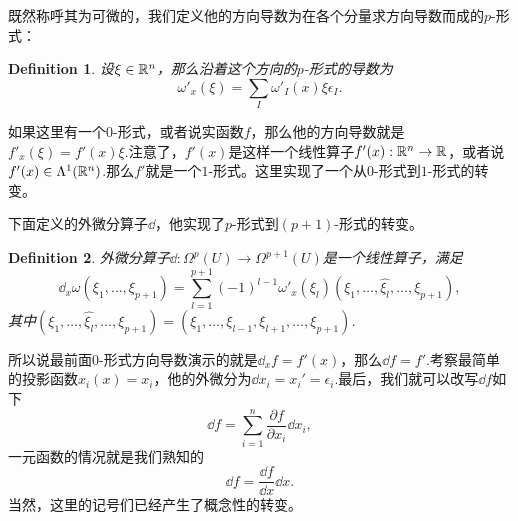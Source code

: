 \documentclass[11pt]{extbook}
\theoremstyle{plain}%
\newtheorem{defi}{Definition}[section]%
\begin{document}
既然称呼其为可微的，我们定义他的方向导数为在各个分量求方向导数而成的$p$-形式：
\begin{defi}
设$\xi \in \mathbb{R}^n$，那么沿着这个方向的$p$-形式的导数为
\[
\omega'_x(\xi)=\sum_I\omega'_I(x)\xi \epsilon_I.
\]
\end{defi}
如果这里有一个$0$-形式，或者说实函数$f$，那么他的方向导数就是$f'_x(\xi)=f'(x)\xi$.注意了，$f'(x)$是这样一个线性算子$f'(x):\mathbb{R}^n\to \mathbb{R}$，或者说$f'(x)\in \Lambda^1(\mathbb{R}^n)$.那么$f'$就是一个$1$-形式。这里实现了一个从$0$-形式到$1$-形式的转变。

下面定义的外微分算子$\dd$，他实现了$p$-形式到$(p+1)$-形式的转变。
\begin{defi}
外微分算子$\dd:\Omega^p(U)\to\Omega^{p+1}(U)$是一个线性算子，满足
\[
\dd_x\omega(\xi_1,\dots,\xi_{p+1})=\sum_{l=1}^{p+1}(-1)^{l-1}\omega'_x(\xi_l)(\xi_1,\dots,\hat{\xi_l},\dots,\xi_{p+1}),
\]
其中$(\xi_1,\dots,\hat{\xi_l},\dots,\xi_{p+1})=(\xi_1,\dots,\xi_{l-1},\xi_{l+1},\dots,\xi_{p+1})$.
\end{defi}
所以说最前面$0$-形式方向导数演示的就是$\dd_x f=f'(x)$，那么$\dd f=f'$.考察最简单的投影函数$x_i(x)=x_i$，他的外微分为$\dd x_i=x_i'=\epsilon_i$.最后，我们就可以改写$\dd f$如下
\begin{equation}
\label{dd1}
\dd f =\sum_{i=1}^n\frac{\partial f}{\partial x_i}\dd x_i,
\end{equation}
一元函数的情况就是我们熟知的
\[
\dd f =\frac{\dd f}{\dd x}\dd x.
\]
当然，这里的记号们已经产生了概念性的转变。
\end{document}
